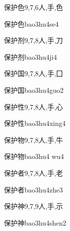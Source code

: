 \begin{Entry}{保护色}{9,7,6}{⼈,⼿,⾊}
  \begin{Phonetics}{保护色}{bao3hu4se4}
  \end{Phonetics}
\end{Entry}

\begin{Entry}{保护剂}{9,7,8}{⼈,⼿,⼑}
  \begin{Phonetics}{保护剂}{bao3hu4ji4}
  \end{Phonetics}
\end{Entry}

\begin{Entry}{保护国}{9,7,8}{⼈,⼿,⼞}
  \begin{Phonetics}{保护国}{bao3hu4guo2}
  \end{Phonetics}
\end{Entry}

\begin{Entry}{保护性}{9,7,8}{⼈,⼿,⼼}
  \begin{Phonetics}{保护性}{bao3hu4xing4}
  \end{Phonetics}
\end{Entry}

\begin{Entry}{保护物}{9,7,8}{⼈,⼿,⽜}
  \begin{Phonetics}{保护物}{bao3hu4 wu4}
  \end{Phonetics}
\end{Entry}

\begin{Entry}{保护者}{9,7,8}{⼈,⼿,⽼}
  \begin{Phonetics}{保护者}{bao3hu4zhe3}
  \end{Phonetics}
\end{Entry}

\begin{Entry}{保护神}{9,7,9}{⼈,⼿,⽰}
  \begin{Phonetics}{保护神}{bao3hu4shen2}
  \end{Phonetics}
\end{Entry}

